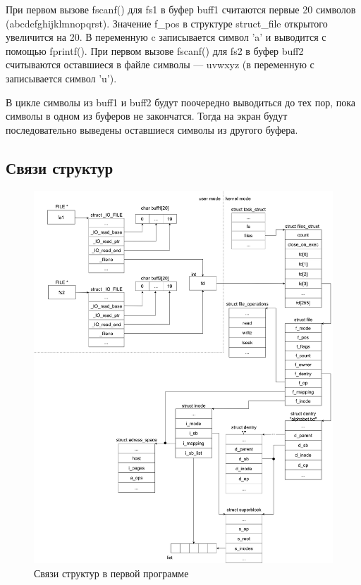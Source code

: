 \documentclass[a4paper,14pt]{extarticle}
\begin{document}
При первом вызове fscanf() для fs1 в буфер buff1 считаются первые 20 символов (abcdefghijklmnopqrst). Значение f\_pos в структуре struct\_file открытого увеличится на 20. В переменную c записывается символ ’a’ и выводится с помощью fprintf(). При первом вызове fscanf() для fs2 в буфер buff2 считываются оставшиеся в файле символы --- uvwxyz (в переменную с записывается символ ’u’).

В цикле символы из buff1 и buff2 будут поочередно выводиться до тех пор, пока символы в одном из буферов не закончатся. Тогда на экран будут последовательно выведены оставшиеся символы из другого буфера.

\newpage
\subsection{Связи структур}

\begin{figure}[H]
	\centering
	\includegraphics[height=0.91\textheight]{img/structures-1.drawio.png}
	\caption{Связи структур в первой программе}
\end{figure}
\end{document}
